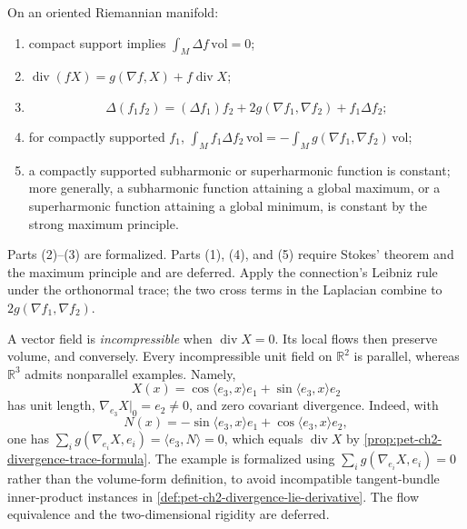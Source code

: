 \begin{remark}
  \label{rem:pet-ch2-ex-27}


  On an oriented Riemannian manifold:
  \begin{enumerate}
    \item compact support implies
      $\int_M\Delta f\,\mathrm{vol}=0$;
    \item
      $\operatorname{div}(fX)
        =g(\nabla f,X)+f\operatorname{div}X$;
    \item
      \[
        \Delta(f_1f_2)
          =(\Delta f_1)f_2+2g(\nabla f_1,\nabla f_2)
           +f_1\Delta f_2;
      \]
    \item for compactly supported $f_1$,
      $\int_Mf_1\Delta f_2\,\mathrm{vol}
       =-\int_Mg(\nabla f_1,\nabla f_2)\,\mathrm{vol}$;
    \item a compactly supported subharmonic or superharmonic function is
      constant; more generally, a subharmonic function attaining a global
      maximum, or a superharmonic function attaining a global minimum, is
      constant by the strong maximum principle.
  \end{enumerate}
  Parts (2)--(3) are formalized. Parts (1), (4), and (5) require Stokes'
  theorem and the maximum principle and are deferred.
  \sketch
  Apply the connection's Leibniz rule under the orthonormal trace; the two
  cross terms in the Laplacian combine to
  $2g(\nabla f_1,\nabla f_2)$.
\end{remark}

\begin{remark}
  \label{rem:pet-ch2-ex-28}


  A vector field is \emph{incompressible} when
  $\operatorname{div}X=0$. Its local flows then preserve volume, and conversely.
  Every incompressible unit field on $\mathbb{R}^2$ is parallel, whereas
  $\mathbb{R}^3$ admits nonparallel examples. Namely,
  \[
    X(x)=\cos\langle e_3,x\rangle e_1
         +\sin\langle e_3,x\rangle e_2
  \]
  has unit length, $\nabla_{e_3}X|_0=e_2\ne0$, and zero covariant divergence.
  Indeed, with
  \[
    N(x)=-\sin\langle e_3,x\rangle e_1
          +\cos\langle e_3,x\rangle e_2,
  \]
  one has $\sum_i g(\nabla_{e_i}X,e_i)=\langle e_3,N\rangle=0$, which equals
  $\operatorname{div}X$ by
  \cref{prop:pet-ch2-divergence-trace-formula}.
  The example is formalized using
  $\sum_i g(\nabla_{e_i}X,e_i)=0$ rather than the volume-form definition, to
  avoid incompatible tangent-bundle inner-product instances in
  \cref{def:pet-ch2-divergence-lie-derivative}. The flow
  equivalence and the two-dimensional rigidity are deferred.
\end{remark}

